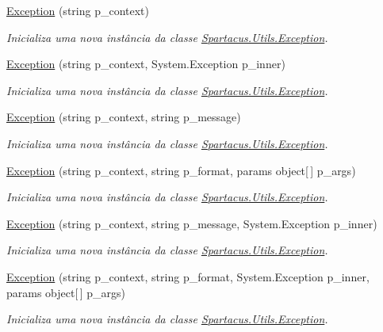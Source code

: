\begin{DoxyCompactItemize}
\item 
\hyperlink{classSpartacus_1_1Utils_1_1Exception_a4981d476deb03f7c04ca4599982c87fd}{Exception} (string p\+\_\+context)
\begin{DoxyCompactList}\small\item\em Inicializa uma nova instância da classe \hyperlink{classSpartacus_1_1Utils_1_1Exception}{Spartacus.\+Utils.\+Exception}. \end{DoxyCompactList}\item 
\hyperlink{classSpartacus_1_1Utils_1_1Exception_a96e063e716856532a0fd3f8e4b949211}{Exception} (string p\+\_\+context, System.\+Exception p\+\_\+inner)
\begin{DoxyCompactList}\small\item\em Inicializa uma nova instância da classe \hyperlink{classSpartacus_1_1Utils_1_1Exception}{Spartacus.\+Utils.\+Exception}. \end{DoxyCompactList}\item 
\hyperlink{classSpartacus_1_1Utils_1_1Exception_a2fde113b7768db590d44920b43912df8}{Exception} (string p\+\_\+context, string p\+\_\+message)
\begin{DoxyCompactList}\small\item\em Inicializa uma nova instância da classe \hyperlink{classSpartacus_1_1Utils_1_1Exception}{Spartacus.\+Utils.\+Exception}. \end{DoxyCompactList}\item 
\hyperlink{classSpartacus_1_1Utils_1_1Exception_a72eb29731cacc2ed5ce06bdd4f0f72d8}{Exception} (string p\+\_\+context, string p\+\_\+format, params object\mbox{[}$\,$\mbox{]} p\+\_\+args)
\begin{DoxyCompactList}\small\item\em Inicializa uma nova instância da classe \hyperlink{classSpartacus_1_1Utils_1_1Exception}{Spartacus.\+Utils.\+Exception}. \end{DoxyCompactList}\item 
\hyperlink{classSpartacus_1_1Utils_1_1Exception_a8b776cfd23b8e6b56fa421dce5749296}{Exception} (string p\+\_\+context, string p\+\_\+message, System.\+Exception p\+\_\+inner)
\begin{DoxyCompactList}\small\item\em Inicializa uma nova instância da classe \hyperlink{classSpartacus_1_1Utils_1_1Exception}{Spartacus.\+Utils.\+Exception}. \end{DoxyCompactList}\item 
\hyperlink{classSpartacus_1_1Utils_1_1Exception_af3b6140989f787a172a10bedbddff1a2}{Exception} (string p\+\_\+context, string p\+\_\+format, System.\+Exception p\+\_\+inner, params object\mbox{[}$\,$\mbox{]} p\+\_\+args)
\begin{DoxyCompactList}\small\item\em Inicializa uma nova instância da classe \hyperlink{classSpartacus_1_1Utils_1_1Exception}{Spartacus.\+Utils.\+Exception}. \end{DoxyCompactList}\end{DoxyCompactItemize}
